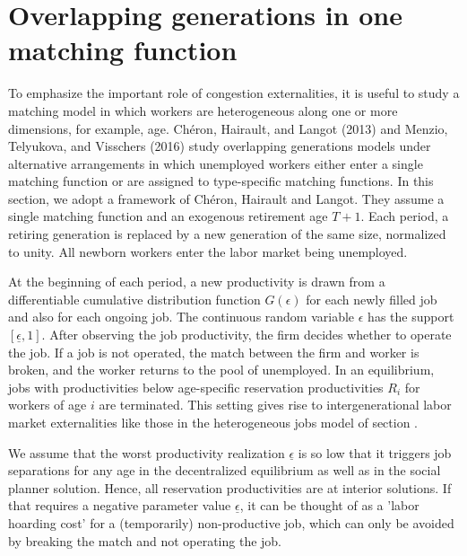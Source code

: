   
\section{Overlapping generations in one matching function}\label{sec:M_OLG1}%
  To emphasize the important role of  congestion externalities, it
  is useful to study a matching model in which workers are heterogeneous along one or more
  dimensions, for example, age.
 Ch\'eron,
Hairault, and Langot (2013) and Menzio, Telyukova, and Visschers (2016)
study overlapping generations  models under alternative arrangements in which unemployed
workers either enter a single matching function or are assigned to type-specific
matching functions. In this section,
we adopt a framework of Ch\'eron, Hairault
and Langot. They  assume a single matching function and an exogenous retirement
age $T+1$. Each period, a retiring generation is replaced by a new generation of the same
size, normalized to unity.  All newborn workers enter the labor market being
unemployed.


At the beginning of each period, a new
productivity is drawn  from a differentiable
cumulative distribution function $G(\epsilon)$
for each newly filled job and also  for each ongoing job.
The continuous random variable $\epsilon$ has the support
$[\underline \epsilon,1]$.
After observing the job
productivity, the firm decides whether  to operate the job. If a job
is not operated, the match between the firm and worker is broken, and the
worker returns to the pool of unemployed. In an equilibrium, jobs with  productivities below
age-specific reservation productivities $R_i$ for  workers of
age $i$ are terminated. This setting gives rise to
intergenerational labor market externalities   like  those in the  heterogeneous jobs model of  section .

We assume that the worst productivity realization $\underline \epsilon$
is so low that it triggers job separations for any age in the
decentralized equilibrium as well as in the social planner solution.
Hence, all reservation productivities are at interior solutions.
If that requires a negative parameter value $\underline \epsilon$, it
can be thought of as a 'labor hoarding cost' for a (temporarily)
non-productive job, which can only be avoided by breaking the match
and not operating the job.



